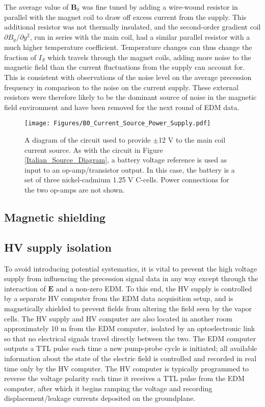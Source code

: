 \documentclass [10pt, twoside] {uwthesis}[2012/04/02]
\begin{document}
The average value of $\mathbf{B}_0$ was fine tuned by adding a wire-wound resistor in parallel with the magnet coil to draw off excess current from the supply. This additional resistor was not thermally insulated, and the second-order gradient coil $\partial B_y/\partial y^2$, run in series with the main coil, had a similar parallel resistor with a much higher temperature coefficient. Temperature changes can thus change the fraction of $I_S$ which travels through the magnet coils, adding more noise to the magnetic field than the current fluctuations from the supply can account for. This is consistent with observations of the noise level on the average precession frequency in comparison to the noise on the current supply. These external resistors were therefore likely to be the dominant source of noise in the magnetic field environment and have been removed for the next round of EDM data.

\begin{figure}
\begin{center}
\texttt{[image: Figures/B0\_Current\_Source\_Power\_Supply.pdf]}
\end{center}
\caption[$\mathbf{B}_0$ power supply diagram]{\narrower A diagram of the circuit used to provide $\pm$12 V to the main coil current source. As with the circuit in Figure \ref{Italian_Source_Diagram}, a battery voltage reference is used as input to an op-amp/transistor output. In this case, the battery is a set of three nickel-cadmium 1.25 V C-cells. Power connections for the two op-amps are not shown.}
\label{Italian_Source_Power_Supply}
\end{figure}

\subsection{Magnetic shielding}

\subsection{HV supply isolation} 
To avoid introducing potential systematics, it is vital to prevent the high voltage supply from influencing the precession signal data in any way except through the interaction of $\mathbf{E}$ and a non-zero EDM. To this end, the HV supply is controlled by a separate HV computer from the EDM data acquisition setup, and is magnetically shielded to prevent fields from altering the field seen by the vapor cells. The HV supply and HV computer are also located in another room approximately 10 m from the EDM computer, isolated by an optoelectronic link so that no electrical signals travel directly between the two. The EDM computer outputs a TTL pulse each time a new pump-probe cycle is initiated; all available information about the state of the electric field is controlled and recorded in real time only by the HV computer. The HV computer is typically programmed to reverse the voltage polarity each time it receives a TTL pulse from the EDM computer, after which it begins ramping the voltage and recording displacement/leakage currents deposited on the groundplane.
\end{document}
